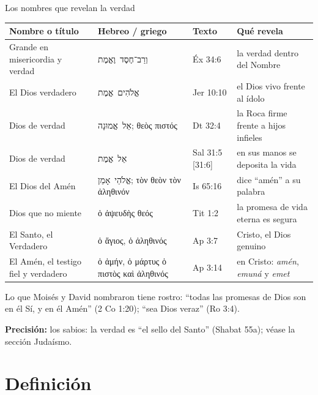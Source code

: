 \documentclass[hyperref={bookmarks=false},aspectratio=169]{beamer}
\newcommand{\heb}[1]{\mbox{\foreignlanguage{hebrew}{#1}}}
\newcommand{\grc}[1]{\foreignlanguage{ancientgreek}{#1}}
\newcommand{\precision}[1]{{\footnotesize\color{gris}\textbf{Precisión:} #1}}
\begin{document}
\begin{frame}{Los nombres que revelan la verdad}
\scriptsize\renewcommand{\arraystretch}{1.12}
\begin{tabular}{@{}>{\RaggedRight\arraybackslash}p{2.7cm}>{\RaggedRight\arraybackslash}p{3.6cm}>{\RaggedRight\arraybackslash}p{1.7cm}>{\RaggedRight\arraybackslash}p{3.8cm}@{}}
\toprule
\textbf{Nombre o título} & \textbf{Hebreo / griego} & \textbf{Texto} & \textbf{Qué revela} \\ \midrule
Grande en misericordia y verdad & \heb{וְרַב־חֶסֶד וֶאֱמֶת} & Éx 34:6 & la verdad dentro del Nombre \\
El Dios verdadero & \heb{אֱלֹהִים אֱמֶת} & Jer 10:10 & el Dios vivo frente al ídolo \\
Dios de verdad & \heb{אֵל אֱמוּנָה}; \grc{θεὸς πιστός} & Dt 32:4 & la Roca firme frente a hijos infieles \\
Dios de verdad & \heb{אֵל אֱמֶת} & Sal 31:5 [31:6] & en sus manos se deposita la vida \\
El Dios del Amén & \heb{אֱלֹהֵי אָמֵן}; \grc{τὸν θεὸν τὸν ἀληθινόν} & Is 65:16 & dice ``amén'' a su palabra \\
Dios que no miente & \grc{ὁ ἀψευδὴς θεός} & Tit 1:2 & la promesa de vida eterna es segura \\
El Santo, el Verdadero & \grc{ὁ ἅγιος, ὁ ἀληθινός} & Ap 3:7 & Cristo, el Dios genuino \\
El Amén, el testigo fiel y verdadero & \grc{ὁ ἀμήν, ὁ μάρτυς ὁ πιστὸς καὶ ἀληθινός} & Ap 3:14 & en Cristo: \emph{amén}, \emph{emuná} y \emph{emet} \\
\bottomrule
\end{tabular}\par\smallskip
\small Lo que Moisés y David nombraron tiene rostro: ``todas las promesas de Dios son en él Sí, y en él Amén'' (2 Co 1:20); ``sea Dios veraz'' (Ro 3:4).\par\smallskip
\precision{los sabios: la verdad es ``el sello del Santo'' (Shabat 55a); véase la sección Judaísmo.}
\end{frame}

\section{Definición}
\end{document}
